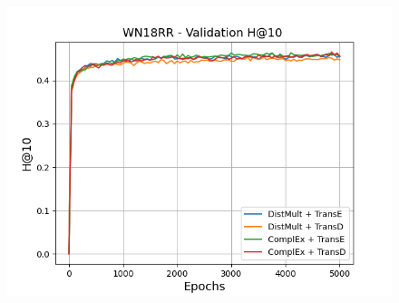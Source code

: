 \begin{figure}
\begin{minipage}{.3\textwidth}
    \end{minipage}
    \begin{minipage}{.3\textwidth}
      \centering
      \includegraphics[width=\linewidth]{figures/results/gan_train/not_pretrained/random/wn18rr/epochs5000/random_wn18rr_hit10.png}
    \end{minipage}%
    

\end{figure}
